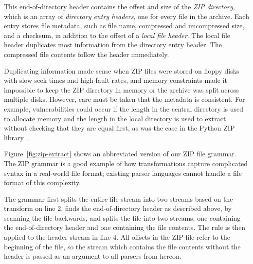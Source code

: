  This end-of-directory
header contains the offset and size of the \emph{ZIP directory}, which
is an array of \emph{directory entry headers}, one for every file
in the archive.  Each entry stores file metadata, such as file name,
compressed and uncompressed size, and a checksum, in addition to the
offset of a \emph{local file header}. The local file header duplicates
most information from the directory entry header. The compressed file
contents follow the header immediately.



Duplicating information made sense when ZIP files were stored on floppy
disks with slow seek times and high fault rates, and memory constraints
made it impossible to keep the ZIP directory in memory or the archive
was split across multiple disks.  However, care must be taken that the
metadata is consistent. For example, vulnerabilities could occur if
the length in the central directory is used to allocate memory and the
length in the local directory is used to extract without checking that
they are equal first, as was the case in the Python ZIP
library~\cite{cve-2012-7338}.
\begin{comment}
\begin{figure}[tb]
\smaller[0.5]

\caption{Signatures of stream transform functions for handling the
end-to-beginning structure of ZIP files.}
\label{fig:zip-eod-xform}
\end{figure}
\end{comment}
Figure~\ref{fig:zip-extract} shows an abbreviated version of our ZIP
file grammar.  The ZIP grammar is a good example of how transformations
capture complicated syntax in a real-world file format; existing parser
languages cannot handle a file format of this complexity.

The  grammar first splits the entire file stream into two
streams based on the  transform on line 2.
finds the end-of-directory header as described above, by scanning the
file backwards, and splits the file into two streams, one containing
the end-of-directory header and one containing the file contents. The
 rule is then applied to the header stream in
line 4. All offsets in the ZIP file refer to the beginning of the
file, so the stream  which contains the file contents
without the header is passed as an argument to all parsers from
hereon. 


